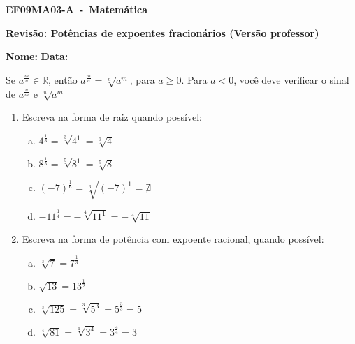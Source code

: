 \documentclass[a4paper,14pt]{article}
\begin{document}
	
	\noindent\textbf{EF09MA03-A~-~Matemática} 
	
	\begin{center}
		\textbf{Revisão: Potências de expoentes fracionários (Versão professor)}
	\end{center}
	
	
	\noindent\textbf{Nome:} \underline{\hspace{10cm}}
    \noindent\textbf{Data:} \underline{\hspace{4cm}}
	
	
	\begin{multicols}{2}
		Se $a^\frac{m}{n} \in \mathbb{R}$, então $a^\frac{m}{n} = \sqrt[n]{a^m}$, para $a \geq 0$. Para $a < 0$, você deve verificar o sinal de $a^\frac{n}{m}$ e $\sqrt[n]{a^m}$
	\begin{enumerate}	
		\item Escreva na forma de raiz quando possível:
		\begin{enumerate}[a)]
			\item $4^\frac{1}{3} = \sqrt[3]{4^1} = \sqrt[3]{4}$ \\
			\item $8^\frac{1}{5} = \sqrt[5]{8^1} = \sqrt[5]{8} $\\
			\item $(-7)^\frac{1}{6} = \sqrt[6]{(-7)^1} = \nexists$ \\
			\item $-11^\frac{1}{4} = - \sqrt[4]{11^1} = - \sqrt[4]{11} $ \\
	    \end{enumerate}
        \item Escreva na forma de potência com expoente racional, quando possível:
        \begin{enumerate}[a)]
        	\item $\sqrt[3]{7} = 7^\frac{1}{3}$ \\
        	\item $\sqrt{13} = 13^\frac{1}{2}$ \\
        	\item $\sqrt[3]{125} = \sqrt[3]{5^3} = 5^\frac{3}{3} = 5$ \\
        	\item $\sqrt[4]{81} = \sqrt[4]{3^4} = 3^\frac{4}{4} = 3$ \\

\end{enumerate}
\end{enumerate}
\end{multicols}
\end{document}
